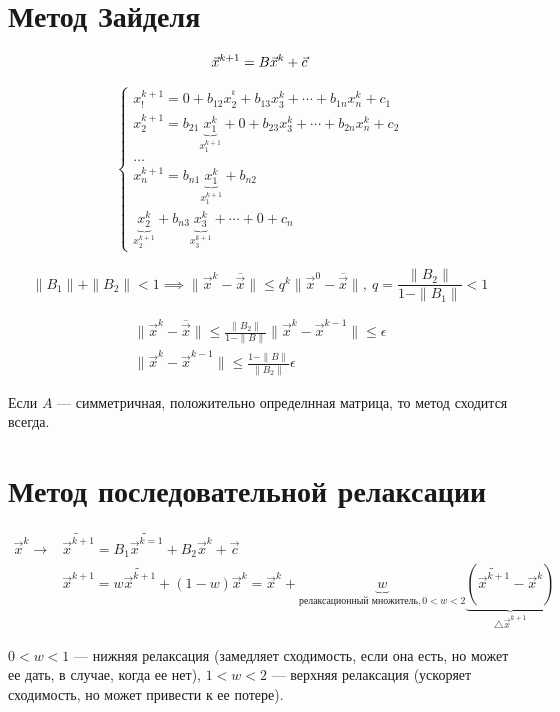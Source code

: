 \section{Метод Зайделя}
\[ 
  \vec{x}^{k + 1} = B \vec{x}^k + \vec{c} \\
\]  

\begin{gather*}
  \begin{cases}
    x_!^{k + 1} = 0 + b_{12} x_2^^k +b_{13}x_3^k + \cdots + b_{1n}x_n^k  + c_1 \\
    x_2^{k + 1} = b_{21} \underbrace{x_1^k}_{x_1^{k + 1}} + 0 + b_{23}x_3^k + \cdots + b_{2n}x_n^k + c_2 \\
    \dots\\
    x_n^{k + 1} = b_{n1} \underbrace{x_1^k}_{x_1^{k + 1}} + b_{n2} \\
    \underbrace{x_2^k}_{x_2^{k + 1}} + b_{n3} \underbrace{x_3^k}_{x_3^{k + 1}} + \cdots + 0 + c_n
  \end{cases}
\end{gather*}

\begin{note}
  \[
    \|B_1\| + \|B_2\| < 1 \implies \|\vec{x}^k -\overline{\vec{x}}\| \leq q^k
    \|\vec{x}^0 - \overline{\vec{x}}\|,\ q = \frac{\|B_2\|}{1 - \|B_1\|} < 1
  \]
\end{note}

\begin{note}
  \begin{gather*}
    \|\vec{x}^k - \overline{\vec{x}}\| \leq \frac{\|B_2\|}{1 - \|B\|}\|\vec{x}^k
    - \vec{x}^{k - 1}\| \leq \epsilon \\
    \|\vec{x}^k - \vec{x}^{k - 1}\| \leq \frac{1 - \|B\|}{\|B_2\|} \epsilon 
  \end{gather*}
\end{note}

\begin{stm}
  Если $A$ --- симметричная, положительно определнная матрица, то метод сходится всегда.
\end{stm}

\section{Метод последовательной релаксации}

\begin{align*}
  \vec{x}^k \to &\tilde{\vec{x}^{k + 1}} = B_1 \tilde{\vec{x}^{k = 1}} + B_2\vec{x}^k + \vec{c}\\
                &\vec{x}^{k + 1}  = w \tilde{\vec{x}^{k + 1}} + (1 - w)\vec{x}^k = \vec{x}^k + \underbrace{w}_{\text{релаксационный множитель}, 0 < w < 2} \underbrace{(\tilde{\vec{x}^{k + 1}} - \vec{x}^k)}_{\triangle \vec{x}^{k + 1}}
\end{align*}

\begin{note}
  $0 < w < 1$ --- нижняя релаксация (замедляет сходимость, если она есть, но
  может ее дать, в случае, когда ее нет), $1 < w < 2$ --- верхняя релаксация
  (ускоряет сходимость, но может привести к ее потере).
\end{note}